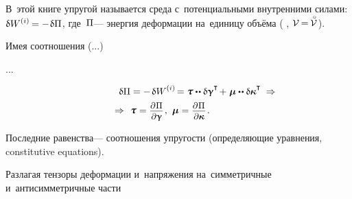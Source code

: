 \begin{otherlanguage}{russian}

В~этой книге упругой называется среда с~потенциальными внутренними силами:
${\variation{\internalwork} = - \hspace{.16ex} \variation{\potential}}$,
где~$\Pi$\:--- энергия деформации на~единицу объёма
( , ${\mathcal{V} \hspace{-0.2ex} = \hspace{-0.2ex} \mathcircabove{\mathcal{V}}\hspace{.12ex}}$).

Имея соотношения (...)

...

\begin{multline}\label{micropolar.constitutiveequations}
\hspace*{4em}
\variation{\potential} = - \hspace{.25ex} \variation{\internalwork} \hspace{-0.15ex}
= \forcestresstensor \dotdotp \variation{\distortiontensor}^{\T} \hspace{-0.25ex}
+ \hspace{.1ex} \couplestresstensor \dotdotp \variation{\wrynesstensor}^{\T}
\hspace{.6ex} \Rightarrow
\\[-0.1em]
%
\Rightarrow \hspace{.88ex}
\forcestresstensor = \scalebox{0.92}[0.92]{$ \displaystyle \frac{\raisemath{-0.125em}{\partial\hspace{.1ex} \potential^{\mathstrut}}}{\partial \distortiontensor}$}
\hspace{.15ex} ,
\hspace{.8ex}
\couplestresstensor = \scalebox{0.92}[0.92]{$ \displaystyle \frac{\raisemath{-0.125em}{\partial\hspace{.1ex} \potential^{\mathstrut}}}{\partial \wrynesstensor}$}
\hspace{.2ex} .
\hspace*{3.33em}
\end{multline}

Последние равенства\:--- соотношения упругости (определяющие уравнения, constitutive equations).

Разлагая тензоры деформации и~напряжения на~симметричные и~антисимметричные части


\end{otherlanguage}
